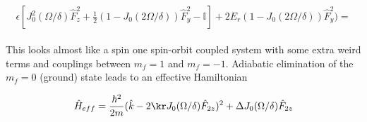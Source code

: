 \begin{align}
\begin{split}
\epsilon[J_0^2(\Omega/\delta)\hat{F}_z^2 + \frac{1}{2}(1-J_0(2\Omega/\delta))\hat{F}_y^2-\mathbb{I}]+2E_r (1-J_0(2\Omega/\delta))\hat{F}_y^2) = 
\end{split}
\end{align}


This looks almost like a spin one spin-orbit coupled system with some extra weird terms and couplings between $m_f=1$ and $m_f= -1$. Adiabatic elimination of the $m_f=0$ (ground) state leads to an effective Hamiltonian

\begin{align}
\hat{H}_{eff} = \frac{\hbar^2}{2m}(\hat{k} - 2\kr     J_0(\Omega/\delta)\hat{F}_{2z})^2 + \Delta J_0(\Omega/\delta)\hat{F}_{2z}
\end{align}


